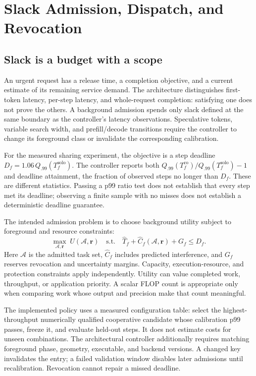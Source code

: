 \section{Slack Admission, Dispatch, and Revocation}
\label{sec:control}
\subsection{Slack is a budget with a scope}
An urgent request has a release time, a completion objective, and a current
estimate of its remaining service demand. The architecture distinguishes
first-token latency, per-step latency, and whole-request completion: satisfying
one does not prove the others. A background admission spends only slack
defined at the same boundary as the controller's latency observations.
Speculative tokens, variable search width, and prefill/decode transitions
require the controller to change its foreground class or invalidate the
corresponding calibration.

For the measured sharing experiment, the objective is a step deadline
$D_f=1.06\,Q_{.99}(T_f^{\mathrm{solo}})$. The controller reports both
$Q_{.99}(T_f^{\mathrm{co}})/Q_{.99}(T_f^{\mathrm{solo}})-1$ and deadline
attainment, the fraction of observed steps no longer than $D_f$. These are
different statistics. Passing a p99 ratio test does not establish that every
step met its deadline; observing a finite sample with no misses does not
establish a deterministic deadline guarantee.

The intended admission problem is to choose background utility subject to
foreground and resource constraints:
\begin{equation}
 \max_{\mathcal A,\mathbf r}\; U(\mathcal A,\mathbf r)
 \quad\text{s.t.}\quad
 \widehat T_f+\widehat C_f(\mathcal A,\mathbf r)+G_f\leq D_f.
\end{equation}
Here $\mathcal A$ is the admitted task set, $\widehat C_f$ includes predicted
interference, and $G_f$ reserves revocation and uncertainty margins. Capacity,
execution-resource, and protection constraints apply independently. Utility
can value completed work, throughput, or application priority. A scalar
FLOP count is appropriate only when comparing work whose output and precision
make that count meaningful.

The implemented policy uses a measured configuration table: select the
highest-throughput numerically qualified cooperative candidate whose
calibration p99 passes, freeze it, and evaluate held-out steps. It does not
estimate costs for unseen combinations. The architectural controller additionally
requires matching foreground phase, geometry, executable, and backend versions.
A changed key invalidates the entry; a failed validation window disables later
admissions until recalibration. Revocation cannot repair a missed deadline.

